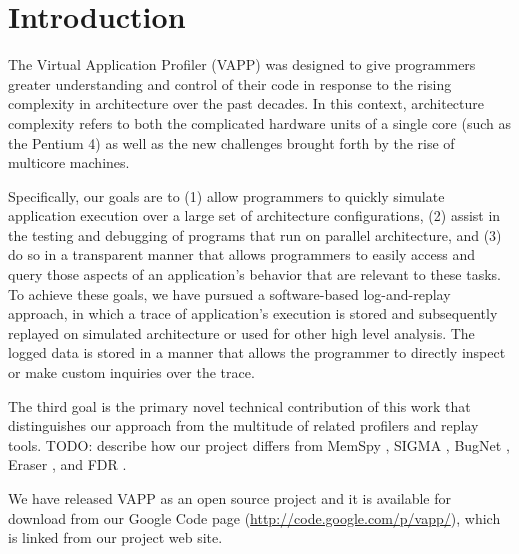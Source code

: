 \section{Introduction}
The Virtual Application Profiler (VAPP) was designed to give programmers
greater understanding and control of their code in response to
the rising complexity in architecture over the past decades.
In this context, architecture complexity refers to both the
complicated hardware units of a single core (such as the Pentium 4)
as well as the new challenges brought forth by the rise of
multicore machines.

Specifically, our goals are to (1) allow programmers to quickly
simulate application execution over a large set of architecture
configurations, (2) assist in the testing and debugging of
programs that run on parallel architecture, and (3) do so in a
transparent manner that allows programmers to easily access and
query those aspects of an application's behavior that are relevant to
these tasks.  To achieve these goals, we have pursued a software-based
log-and-replay approach, in which a trace of application's execution
is stored and subsequently replayed on simulated architecture or
used for other high level analysis.  The logged data is stored
in a manner that allows the programmer to directly inspect or
make custom inquiries over the trace.

The third goal is the primary novel technical contribution of this
work that distinguishes our approach from the multitude of
related profilers and replay tools.  TODO: describe how our
project differs from MemSpy \cite{martonosi1992memspy},
SIGMA \cite{derose2002sigma}, BugNet \cite{narayansamy2005bugnet},
Eraser \cite{savage1997eraser}, and FDR \cite{xu2003fdr}.

We have released VAPP as an open source project and it is available
for download from our Google Code page (\url{http://code.google.com/p/vapp/}),
which is linked from our project web site.
